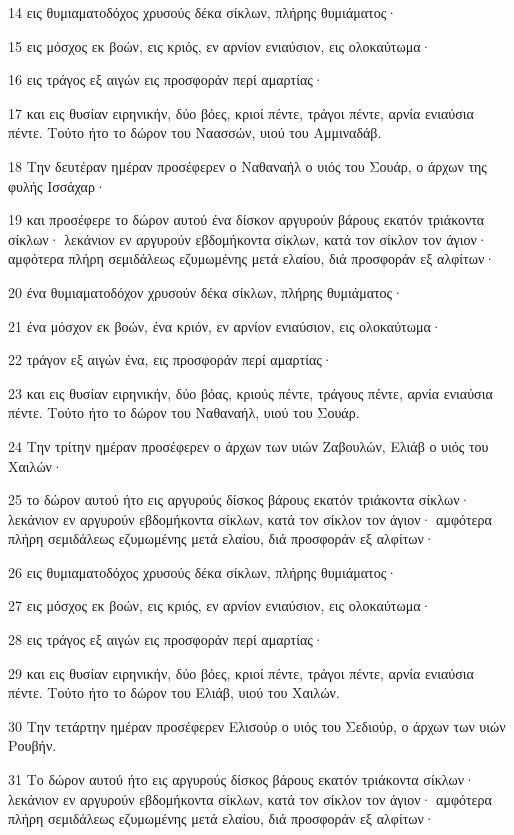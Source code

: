 \par 14 εις θυμιαματοδόχος χρυσούς δέκα σίκλων, πλήρης θυμιάματος·
\par 15 εις μόσχος εκ βοών, εις κριός, εν αρνίον ενιαύσιον, εις ολοκαύτωμα·
\par 16 εις τράγος εξ αιγών εις προσφοράν περί αμαρτίας·
\par 17 και εις θυσίαν ειρηνικήν, δύο βόες, κριοί πέντε, τράγοι πέντε, αρνία ενιαύσια πέντε. Τούτο ήτο το δώρον του Ναασσών, υιού του Αμμιναδάβ.
\par 18 Την δευτέραν ημέραν προσέφερεν ο Ναθαναήλ ο υιός του Σουάρ, ο άρχων της φυλής Ισσάχαρ·
\par 19 και προσέφερε το δώρον αυτού ένα δίσκον αργυρούν βάρους εκατόν τριάκοντα σίκλων· λεκάνιον εν αργυρούν εβδομήκοντα σίκλων, κατά τον σίκλον τον άγιον· αμφότερα πλήρη σεμιδάλεως εζυμωμένης μετά ελαίου, διά προσφοράν εξ αλφίτων·
\par 20 ένα θυμιαματοδόχον χρυσούν δέκα σίκλων, πλήρης θυμιάματος·
\par 21 ένα μόσχον εκ βοών, ένα κριόν, εν αρνίον ενιαύσιον, εις ολοκαύτωμα·
\par 22 τράγον εξ αιγών ένα, εις προσφοράν περί αμαρτίας·
\par 23 και εις θυσίαν ειρηνικήν, δύο βόας, κριούς πέντε, τράγους πέντε, αρνία ενιαύσια πέντε. Τούτο ήτο το δώρον του Ναθαναήλ, υιού του Σουάρ.
\par 24 Την τρίτην ημέραν προσέφερεν ο άρχων των υιών Ζαβουλών, Ελιάβ ο υιός του Χαιλών·
\par 25 το δώρον αυτού ήτο εις αργυρούς δίσκος βάρους εκατόν τριάκοντα σίκλων· λεκάνιον εν αργυρούν εβδομήκοντα σίκλων, κατά τον σίκλον τον άγιον· αμφότερα πλήρη σεμιδάλεως εζυμωμένης μετά ελαίου, διά προσφοράν εξ αλφίτων·
\par 26 εις θυμιαματοδόχος χρυσούς δέκα σίκλων, πλήρης θυμιάματος·
\par 27 εις μόσχος εκ βοών, εις κριός, εν αρνίον ενιαύσιον, εις ολοκαύτωμα·
\par 28 εις τράγος εξ αιγών εις προσφοράν περί αμαρτίας·
\par 29 και εις θυσίαν ειρηνικήν, δύο βόες, κριοί πέντε, τράγοι πέντε, αρνία ενιαύσια πέντε. Τούτο ήτο το δώρον του Ελιάβ, υιού του Χαιλών.
\par 30 Την τετάρτην ημέραν προσέφερεν Ελισούρ ο υιός του Σεδιούρ, ο άρχων των υιών Ρουβήν.
\par 31 Το δώρον αυτού ήτο εις αργυρούς δίσκος βάρους εκατόν τριάκοντα σίκλων· λεκάνιον εν αργυρούν εβδομήκοντα σίκλων, κατά τον σίκλον τον άγιον· αμφότερα πλήρη σεμιδάλεως εζυμωμένης μετά ελαίου, διά προσφοράν εξ αλφίτων·
